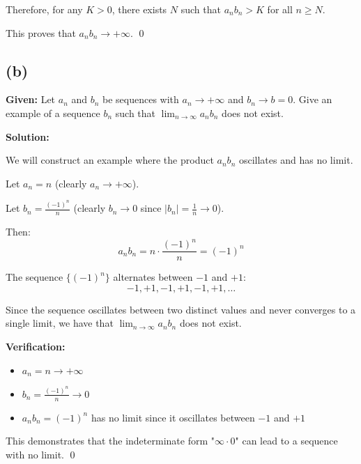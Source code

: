 \documentclass[12pt,a4paper]{article}
\theoremstyle{definition}
\theoremstyle{remark}
\begin{document}
Therefore, for any $K > 0$, there exists $N$ such that $a_n b_n > K$ for all $n \geq N$.

This proves that $a_n b_n \to +\infty$. \qed

\subsection*{(b)}

\textbf{Given:} Let $a_n$ and $b_n$ be sequences with $a_n \to +\infty$ and $b_n \to b = 0$.
Give an example of a sequence $b_n$ such that $\lim_{n \to \infty} a_n b_n$ does not exist.

\textbf{Solution:}

We will construct an example where the product $a_n b_n$ oscillates and has no limit.

Let $a_n = n$ (clearly $a_n \to +\infty$).

Let $b_n = \frac{(-1)^n}{n}$ (clearly $b_n \to 0$ since $|b_n| = \frac{1}{n} \to 0$).

Then:
$$a_n b_n = n \cdot \frac{(-1)^n}{n} = (-1)^n$$

The sequence $\{(-1)^n\}$ alternates between $-1$ and $+1$:
$$-1, +1, -1, +1, -1, +1, \ldots$$

Since the sequence oscillates between two distinct values and never converges to a single limit, we have that $\lim_{n \to \infty} a_n b_n$ does not exist.

\textbf{Verification:}
\begin{itemize}
\item $a_n = n \to +\infty$ \checkmark
\item $b_n = \frac{(-1)^n}{n} \to 0$ \checkmark
\item $a_n b_n = (-1)^n$ has no limit since it oscillates between $-1$ and $+1$ \checkmark
\end{itemize}

This demonstrates that the indeterminate form "$\infty \cdot 0$" can lead to a sequence with no limit. \qed
\end{document}

